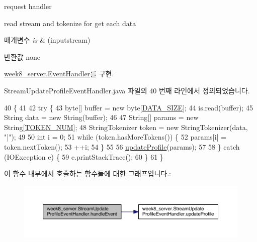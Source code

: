 request handler 

read stream and tokenize for get each data 
\begin{DoxyParams}{매개변수}
{\em is} & (inputstream) \\
\hline
\end{DoxyParams}
\begin{DoxyReturn}{반환값}
none 
\end{DoxyReturn}


\hyperlink{interfaceweek8__server_1_1_event_handler_a24d2832c020ae27428c12be6d5277e51}{week8\-\_\-server.\-Event\-Handler}를 구현.



Stream\-Update\-Profile\-Event\-Handler.\-java 파일의 40 번째 라인에서 정의되었습니다.


\begin{DoxyCode}
40                                             \{
41 
42         \textcolor{keywordflow}{try} \{
43             byte[] buffer = \textcolor{keyword}{new} byte[\hyperlink{classweek8__server_1_1_stream_update_profile_event_handler_aa635f419e6b73e10089f152538ce0b51}{DATA\_SIZE}];
44             is.read(buffer);
45             String data = \textcolor{keyword}{new} String(buffer);
46 
47             String[] params = \textcolor{keyword}{new} String[\hyperlink{classweek8__server_1_1_stream_update_profile_event_handler_a23249215f663a5224287bb8e0c9d0588}{TOKEN\_NUM}];
48             StringTokenizer token = \textcolor{keyword}{new} StringTokenizer(data, \textcolor{stringliteral}{"|"});
49 
50             \textcolor{keywordtype}{int} i = 0;
51             \textcolor{keywordflow}{while} (token.hasMoreTokens()) \{
52                 params[i] = token.nextToken();
53                 ++i;
54             \}
55 
56             \hyperlink{classweek8__server_1_1_stream_update_profile_event_handler_ab2a9e69d8c970f9f8ea254337f53f558}{updateProfile}(params);
57 
58         \} \textcolor{keywordflow}{catch} (IOException e) \{
59             e.printStackTrace();
60         \}
61     \}
\end{DoxyCode}


이 함수 내부에서 호출하는 함수들에 대한 그래프입니다.\-:
\nopagebreak
\begin{figure}[H]
\begin{center}
\leavevmode
\includegraphics[width=350pt]{classweek8__server_1_1_stream_update_profile_event_handler_a9cf985ef61eff5226bc397d72847abed_cgraph}
\end{center}
\end{figure}


